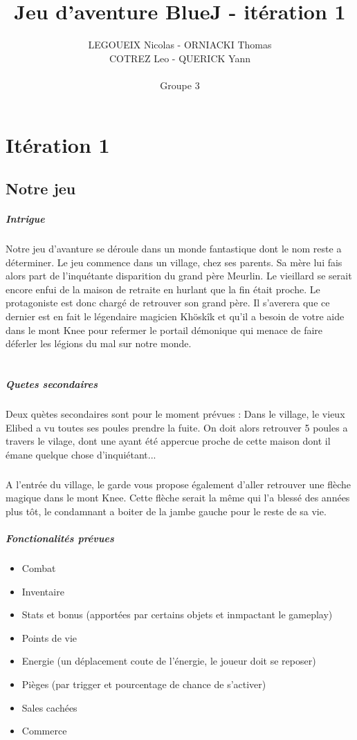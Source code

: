 \documentclass[11pt,a4paper]{report}
\author{LEGOUEIX Nicolas - ORNIACKI Thomas\\ COTREZ Leo - QUERICK Yann\\~\\ Groupe 3}
\title{Jeu d'aventure BlueJ - itération 1}
\begin{document}
\maketitle
\chapter{Itération 1}
\section{Notre jeu}
\paragraph{Intrigue}
Notre jeu d'avanture se déroule dans un monde fantastique dont le nom reste a déterminer. Le jeu commence dans un village, chez ses parents. Sa mère lui fais alors part de l'inquétante disparition du grand père Meurlin. Le vieillard se serait encore enfui de la maison de retraite en hurlant que la fin était proche. Le protagoniste est donc chargé de retrouver son grand père. Il s'averera que ce dernier est en fait le légendaire magicien Khöskîk et qu'il a besoin de votre aide dans le mont Knee pour refermer le portail démonique qui menace de faire déferler les légions du mal sur notre monde.\\~\\
\paragraph{Quetes secondaires}
Deux quètes secondaires sont pour le moment prévues : Dans le village, le vieux Elibed a vu toutes ses poules prendre la fuite. On doit alors retrouver 5 poules a travers le vilage, dont une ayant été appercue proche de cette maison dont il émane quelque chose d'inquiétant...
\paragraph{}
A l'entrée du village, le garde vous propose également d'aller retrouver une flèche magique dans le mont Knee. Cette flèche serait la même qui l'a blessé des années plus tôt, le condamnant a boiter de la jambe gauche pour le reste de sa vie.
\paragraph{Fonctionalités prévues}
\begin{itemize}
\item Combat
\item Inventaire
\item Stats et bonus (apportées par certains objets et inmpactant le gameplay)
\item Points de vie
\item Energie (un déplacement coute de l'énergie, le joueur doit se reposer)
\item Pièges (par trigger et pourcentage de chance de s'activer)
\item Sales cachées
\item Commerce
\end{itemize}
\end{document}
